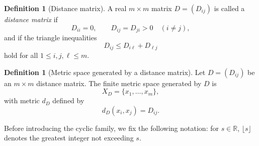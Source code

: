 \documentclass[11pt]{amsart}
\numberwithin{equation}{section}
\theoremstyle{definition}
\newtheorem{definition}[theorem]{Definition}
\theoremstyle{remark}
\newcommand{\R}{\mathbb{R}}
\begin{document}
\begin{definition}[Distance matrix]\label{def:distance-matrix}
A real \(m\times m\) matrix \(D=(D_{ij})\) is called a \emph{distance matrix} if
\begin{equation}\label{eq:distance-matrix-conditions}
D_{ii}=0,\qquad
D_{ij}=D_{ji}>0\quad (i\neq j),
\end{equation}
and if the triangle inequalities
\begin{equation}\label{eq:matrix-triangle-inequality}
D_{ij}\leq D_{i\ell}+D_{\ell j}
\end{equation}
hold for all \(1\leq i,j,\ell\leq m\).
\end{definition}

\begin{definition}[Metric space generated by a distance matrix]\label{def:generated-space}
Let \(D=(D_{ij})\) be an \(m\times m\) distance matrix.  The finite metric space generated by \(D\) is
\begin{equation}\label{eq:generated-space}
X_D=\{x_1,\ldots,x_m\},
\end{equation}
with metric \(d_D\) defined by
\begin{equation}\label{eq:generated-distance}
d_D(x_i,x_j)=D_{ij}.
\end{equation}
\end{definition}

Before introducing the cyclic family, we fix the following notation: for
\(s\in\R\), \(\lfloor s\rfloor\) denotes the greatest integer not exceeding
\(s\).
\end{document}
